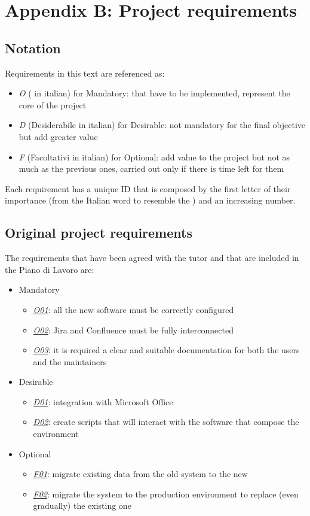 \renewcommand\thechapter{B}
\chapter{Appendix B: Project requirements}
\label{AppendixB}

\section{Notation}
	Requirements in this text are referenced as:
	\begin{itemize}
		\item \textit{O} ( in italian) for Mandatory: that have to be implemented, represent the core of the project
		\item \textit{D} (Desiderabile in italian) for Desirable: not mandatory for the final objective but add greater value
		\item \textit{F} (Facoltativi in italian) for Optional: add value to the project but not as much as the previous ones, carried out only if there is time left for them
	\end{itemize}
	Each requirement has a unique ID that is composed by the first letter of their importance (from the Italian word to resemble the ) and an increasing number.

\newpage
\section{Original project requirements}
	The requirements that have been agreed with the tutor and that are included in the Piano di Lavoro are:
	\begin{itemize}
		\item Mandatory
		\begin{itemize}
			\item \underline{\textit{O01}}: all the new software must be correctly configured
			\item \underline{\textit{O02}}: Jira and Confluence must be fully interconnected
			\item \underline{\textit{O03}}: it is required a clear and suitable documentation for both the users and the maintainers
		\end{itemize}
		\item Desirable
		\begin{itemize}
			\item \underline{\textit{D01}}: integration with Microsoft Office
			\item \underline{\textit{D02}}: create scripts that will interact with the software that compose the environment
		\end{itemize}
		\item Optional
		\begin{itemize}
			\item \underline{\textit{F01}}: migrate existing data from the old system to the new
			\item \underline{\textit{F02}}: migrate the system to the production environment to replace (even gradually) the existing one
		\end{itemize} 
	\end{itemize}

